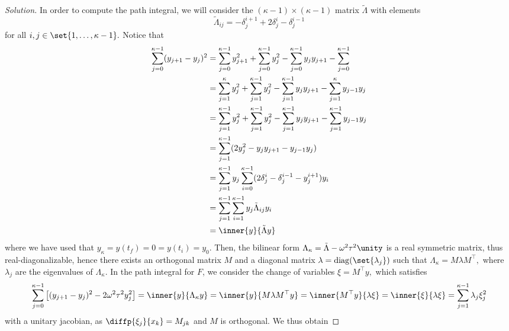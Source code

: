 \begin{proof}[Solution]
   In order to compute the path integral, we will consider the \((\kappa - 1) \times (\kappa - 1)\) matrix \(\tilde{\Lambda}\) with elements
   \begin{equation*}
      \tilde{\Lambda}_{ij} = -\delta^{i + 1}_{j}  + 2\delta^{i}_{j} - \delta^{i - 1}_{j}
   \end{equation*}
   for all \(i,j \in \set{1, \dots, \kappa-1}.\) Notice that
   \begin{align*}
      \sum_{j = 0}^{\kappa - 1} (y_{j + 1} - y_{j})^2 
      &= \sum_{j = 0}^{\kappa - 1} y_{j + 1}^2 + \sum_{j = 0}^{\kappa - 1} y_j^2 - \sum_{j = 0}^{\kappa - 1} y_{j} y_{j + 1} - \sum_{j = 0}^{\kappa -1}\\
      &= \sum_{j = 1}^{\kappa} y_j^2 + \sum_{j = 1}^{\kappa - 1} y_j^2 - \sum_{j = 1}^{\kappa - 1} y_j y_{j+1} - \sum_{j = 1}^{\kappa} y_{j-1} y_j\\
      &= \sum_{j = 1}^{\kappa-1} y_j^2 + \sum_{j = 1}^{\kappa - 1} y_j^2 - \sum_{j = 1}^{\kappa - 1} y_j y_{j+1} - \sum_{j = 1}^{\kappa-1} y_{j-1} y_j\\
      &= \sum_{j = 1}^{\kappa - 1} (2 y_j^2 - y_j y_{j+1} - y_{j-1} y_j)\\
      &= \sum_{j = 1}^{\kappa - 1} y_j \sum_{i = 0}^{\kappa - 1} (2 \delta^i_j - \delta^{i-1}_{j} - y^{i + 1}_{j})y_i\\
      &= \sum_{j = 1}^{\kappa - 1} \sum_{i = 1}^{\kappa - 1} y_j \tilde{\Lambda}_{ij} y_i\\
      &= \inner{y}{\tilde{\Lambda} y}
   \end{align*}
   where we have used that \(y_\kappa = y(t_f) = 0 = y(t_i) = y_0.\) Then, the bilinear form \(\Lambda_\kappa = \tilde{\Lambda} - \omega^2 \tau^2 \unity\) is a real symmetric matrix, thus real-diagonalizable, hence there exists an orthogonal matrix \(M\) and a diagonal matrix \(\lambda = \operatorname{diag}(\set{\lambda_j})\) such that \(\Lambda_\kappa = M\lambda M^\top,\) where \(\lambda_j\) are the eigenvalues of \(\Lambda_\kappa.\) In the path integral for \(F\), we consider the change of variables \(\xi = M^\top y,\) which satisfies
   \begin{equation*}
      \sum_{j = 0}^{\kappa - 1} \left[(y_{j+1} - y_j)^2 - 2 \omega^2 \tau^2 y_j^2\right] = \inner{y}{\Lambda_\kappa y} =\inner{y}{M \lambda M^\top y} = \inner{M^\top y}{\lambda \xi} = \inner{\xi}{\lambda \xi} = \sum_{j = 1}^{\kappa - 1} \lambda_j \xi_j^2
   \end{equation*}
   with a unitary jacobian, as \(\diffp{\xi_j}{x_k} = M_{jk}\) and \(M\) is orthogonal. We thus obtain

\end{proof}

